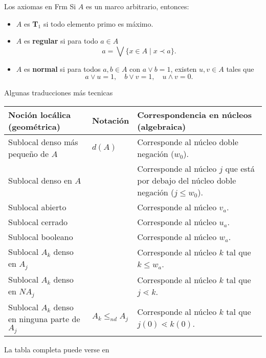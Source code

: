\documentclass[compress,12pt]{beamer}
\begin{document}
\begin{frame}{Los axiomas en Frm}
Si $A$ es un marco arbitrario, entonces:
\begin{itemize}
  \item<1-> $A$ es \textbf{T$_1$} si todo elemento primo es máximo.
  \item<2-> $A$ es \textbf{regular} si para todo $a\in A$
  \[
    a=\bigvee\{x\in A \mid x\prec a\}.
  \]
  \item<3-> $A$ es \textbf{normal} si para todos $a,b\in A$ con $a\vee b=1$, existen $u,v\in A$ tales que
  \[
    a\vee u=1, \quad b\vee v=1, \quad u\wedge v=0.
  \]
\end{itemize}
\end{frame}

\begin{frame}{Algunas traducciones más tecnicas}
\scriptsize
\setlength{\tabcolsep}{2pt}
\renewcommand{\arraystretch}{1.15}
\begin{tabular}{|p{.43\linewidth}|p{.14\linewidth}|p{.43\linewidth}|}
\hline
\textbf{Noción locálica (geométrica)} & \textbf{Notación} & \textbf{Correspondencia en núcleos (algebraica)}\\ \hline
Sublocal denso más pequeño de $A$ & $d(A)$ & Corresponde al núcleo doble negación ($w_0$).\\ \hline
Sublocal denso en $A$ &  & Corresponde al núcleo $j$ que está por debajo del núcleo doble negación ($j\leq w_0$).\\ \hline
Sublocal abierto &  & Corresponde al núcleo $v_a$.\\ \hline
Sublocal cerrado &  & Corresponde al núcleo $u_a$.\\ \hline
Sublocal booleano &  & Corresponde al núcleo $w_a$.\\ \hline
Sublocal $A_k$ denso en $A_j$ &  & Corresponde al núcleo $k$ tal que $k\leq w_a$.\\ \hline
Sublocal $A_k$ denso en $NA_j$ &  & Corresponde al núcleo $k$ tal que $j\lessdot k$.\\ \hline
Sublocal $A_k$ denso en ninguna parte de $A_j$ & $A_k\leq_{nd} A_j$ & Corresponde al núcleo $k$ tal que $j(0)\lessdot k(0)$.\\ \hline
\end{tabular}

\large La tabla completa puede verse en \cite{J.M.}
\end{frame}
\end{document}

